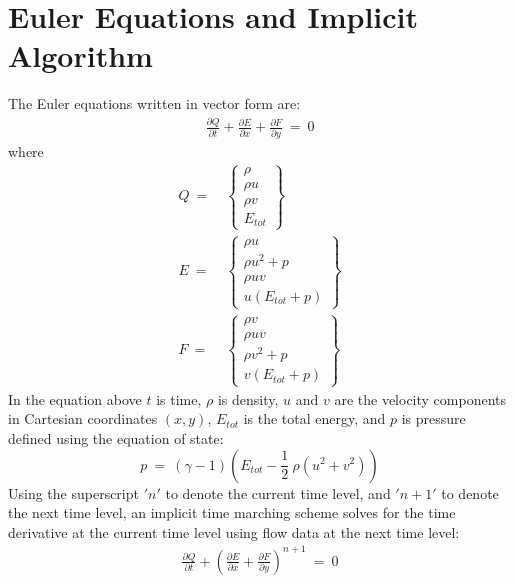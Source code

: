 \documentclass[conf]{new-aiaa}
\begin{document}
\pagebreak
\section{Euler Equations and Implicit Algorithm}
\label{sec:Euler}
The Euler equations written in vector form are:
\begin{equation}
	\begin{split}
		\label{eq:NS}
  			\frac{\partial{Q}}{\partial{t}} + \frac{\partial{E}}{\partial{x}} + \frac{\partial{F}}{\partial{y}}~=~0
	\end{split}
\end{equation}
where
\begin{equation}
	\begin{split}
		\label{eq:Q_E_Vectors}
  			Q~=&~\left\{\begin{matrix}
  				\rho \\
  				\rho u \\
  				\rho v \\
  				E_{tot}
  			\end{matrix}\right\} \\
  			E~=&~\left\{\begin{matrix}
  				\rho u \\
  				\rho u^2+p \\
  				\rho uv \\
  				u(E_{tot}+p)
  			\end{matrix}\right\} \\
  			F~=&~\left\{\begin{matrix}
  				\rho v \\
  				\rho uv \\
  				\rho v^2+p \\
  				v(E_{tot}+p)
  			\end{matrix}\right\}
	\end{split}
\end{equation}
In the equation above $t$ is time, $\rho$ is density, $u$ and $v$ are the velocity components in Cartesian coordinates $(x, y)$, $E_{tot}$ is the total energy, and $p$ is pressure defined using the equation of state:
\begin{equation*}
	p~=~\left(\gamma-1\right)\left(E_{tot}-\frac{1}{2}~\rho \left(u^2+v^2\right)	\right)
\end{equation*} 
Using the superscript $'n'$ to denote the current time level, and $'n+1'$ to denote the next time level, an implicit time marching scheme solves for the time derivative at the current time level using flow data at the next time level:
\begin{equation}
	\begin{split}
		\label{eq:Implicit_Scheme}
  			\frac{\partial{Q}}{\partial{t}} +\left(\frac{\partial{E}}{\partial{x}} +\frac{\partial{F}}{\partial{y}}\right)^{n+1}~=~0
	\end{split}
\end{equation}
\end{document}

